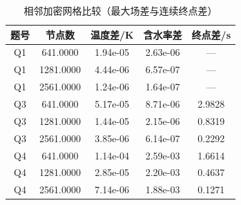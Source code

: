 \begin{table}[htbp]
  \centering
  \caption{相邻加密网格比较（最大场差与连续终点差）}
  \label{tab:all-validation}
  \begin{tabular}{ccccc}
    \toprule
    题号 & 节点数 & 温度差/K & 含水率差 & 终点差/s \\
    \midrule
    Q1 & 641.0000 & 1.94e-05 & 2.63e-06 & — \\
    Q1 & 1281.0000 & 4.44e-06 & 6.57e-07 & — \\
    Q1 & 2561.0000 & 1.24e-06 & 1.64e-07 & — \\
    Q3 & 641.0000 & 5.17e-05 & 8.71e-06 & 2.9828 \\
    Q3 & 1281.0000 & 1.44e-05 & 2.15e-06 & 0.8319 \\
    Q3 & 2561.0000 & 3.85e-06 & 6.14e-07 & 0.2292 \\
    Q4 & 641.0000 & 1.14e-04 & 2.59e-03 & 1.6614 \\
    Q4 & 1281.0000 & 2.85e-05 & 2.20e-03 & 0.4637 \\
    Q4 & 2561.0000 & 7.14e-06 & 1.88e-03 & 0.1271 \\
    \bottomrule
  \end{tabular}
\end{table}
